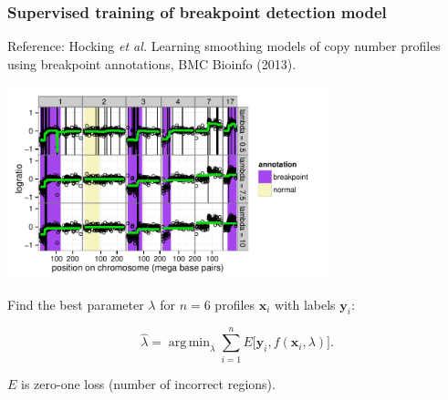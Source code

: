 \documentclass{beamer}
\DeclareMathOperator*{\argmin}{arg\,min}
\begin{document}
\begin{frame}
  \frametitle{Supervised training of breakpoint detection model}

  Reference: Hocking \textit{et al.} Learning smoothing models of copy
  number profiles using breakpoint annotations, BMC Bioinfo
  (2013).

  \begin{center}
      \includegraphics[width=0.7\textwidth]{bams-smoothing}
  \end{center}

  Find the best parameter $\lambda$ for $n=6$ profiles $\mathbf x_i$
  with labels $\mathbf y_i$:

  \begin{equation*}
    \hat \lambda = \argmin_{\lambda}
    \sum_{i=1}^n
    E\big[
      \mathbf y_i,
      f(\mathbf x_i, \lambda)
    \big].
  \end{equation*}

  $E$ is zero-one loss (number of incorrect regions).

\end{frame}
\end{document}
